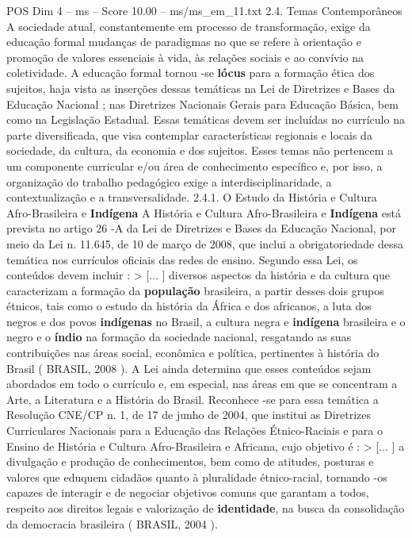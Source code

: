 \begin{textsample}{POS Dim 4 – ms – Score 10.00 – ms/ms\_em\_11.txt}  \label{ex:f4_pos_152}
2.4.
Temas Contemporâneos A sociedade atual, constantemente em processo de transformação, exige da educação formal mudanças de paradigmas no que se refere à orientação e promoção de valores essenciais à vida, às relações sociais e ao convívio na coletividade.
A educação formal tornou -se \textbf{lócus} para a formação ética dos sujeitos, haja vista as inserções dessas temáticas na Lei de Diretrizes e Bases da Educação Nacional ; nas Diretrizes Nacionais Gerais para Educação Básica, bem como na Legislação Estadual.
Essas temáticas devem ser incluídas no currículo na parte diversificada, que visa contemplar características regionais e locais da sociedade, da cultura, da economia e dos sujeitos.
Esses temas não pertencem a um componente curricular e/ou área de conhecimento específico e, por isso, a organização do trabalho pedagógico exige a interdisciplinaridade, a contextualização e a transversalidade. 2.4.1.
O Estudo da História e Cultura Afro-Brasileira e \textbf{Indígena} A História e Cultura Afro-Brasileira e \textbf{Indígena} está prevista no artigo 26 -A da Lei de Diretrizes e Bases da Educação Nacional, por meio da Lei n. 11.645, de 10 de março de 2008, que inclui a obrigatoriedade dessa temática nos currículos oficiais das redes de ensino.
Segundo essa Lei, os conteúdos devem incluir : > [... ] diversos aspectos da história e da cultura que caracterizam a formação da \textbf{população} brasileira, a partir desses dois grupos étnicos, tais como o estudo da história da África e dos africanos, a luta dos negros e dos povos \textbf{indígenas} no Brasil, a cultura negra e \textbf{indígena} brasileira e o negro e o \textbf{índio} na formação da sociedade nacional, resgatando as suas contribuições nas áreas social, econômica e política, pertinentes à história do Brasil ( BRASIL, 2008 ).
A Lei ainda determina que esses conteúdos sejam abordados em todo o currículo e, em especial, nas áreas em que se concentram a Arte, a Literatura e a História do Brasil.
Reconhece -se para essa temática a Resolução CNE/CP n. 1, de 17 de junho de 2004, que institui as Diretrizes Curriculares Nacionais para a Educação das Relações Étnico-Raciais e para o Ensino de História e Cultura Afro-Brasileira e Africana, cujo objetivo é : > [... ] a divulgação e produção de conhecimentos, bem como de atitudes, posturas e valores que eduquem cidadãos quanto à pluralidade étnico-racial, tornando -os capazes de interagir e de negociar objetivos comuns que garantam a todos, respeito aos direitos legais e valorização de \textbf{identidade}, na busca da consolidação da democracia brasileira ( BRASIL, 2004 ).

\end{textsample}

